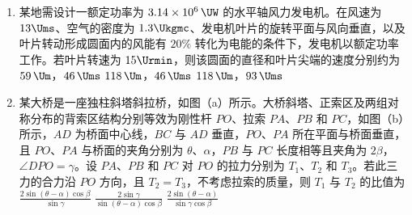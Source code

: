 \documentclass[\gkver]{gaokaozhenti}
\begin{document}
\begin{enumerate}
{C．加速段的后半段是倾斜直线、减速段的前半段也是倾斜直线，在直线和曲线衔接的位置，斜率会发生突变，对应加速度突变，不符合要求，故 C 错误；

D．加速段是上凸的曲线，斜率（加速度）在加速过程持续减小到 0，减速段是下凸的曲线，斜率（加速度的绝对值）持续增大再减小，在加速和匀速的衔接处、匀速和减速的衔接处，斜率会出现突变，对应加速度突变，不符合要求，故 D 错误。

故选 B。
}

\item
某地需设计一额定功率为 $3.14\times10^{6}\,\UW$ 的水平轴风力发电机。在风速为 $13\Ums$、空气的密度为 $1.3\Ukgmc$、发电机叶片的旋转平面与风向垂直，以及叶片转动形成圆面内的风能有 $20\%$ 转化为电能的条件下，发电机以额定功率工作。若叶片转速为 $15\Urmin$，则该圆面的直径和叶片尖端的速度分别约为
{$59\,\Um$，$46\,\Ums$}
{$118\,\Um$，$46\,\Ums$}
{$118\,\Um$，$93\,\Ums$}

\item
某大桥是一座独柱斜塔斜拉桥，如图（a）所示。大桥斜塔、正索区及两组对称分布的背索区结构分别等效为刚性杆 $PO$、拉索 $PA$、$PB$ 和 $PC$，如图（b）所示，$AD$ 为桥面中心线，$BC$ 与 $AD$ 垂直，$PO$、$PA$ 所在平面与桥面垂直，且 $PO$、$PA$ 与桥面的夹角分别为 $\theta$、$\alpha$，$PB$ 与 $PC$ 长度相等且夹角为 $2\beta$，$\angle DPO=\gamma$。设 $PA$、$PB$ 和 $PC$ 对 $PO$ 的拉力分别为 $T_1$、$T_2$ 和 $T_3$。若此三力的合力沿 $PO$ 方向，且 $T_2=T_3$，不考虑拉索的质量，则 $T_1$ 与 $T_2$ 的比值为
\fourchoices[answer=A]
{$\frac{2\sin\gamma\cos\beta}{\sin(\theta-\alpha)}$}
{$\frac{2\sin(\theta-\alpha)\cos\beta}{\sin\gamma}$}
{$\frac{2\sin\gamma}{\sin(\theta-\alpha)\cos\beta}$}
{$\frac{2\sin(\theta-\alpha)}{\sin\gamma\cos\beta}$}
\end{enumerate}
\end{document}
